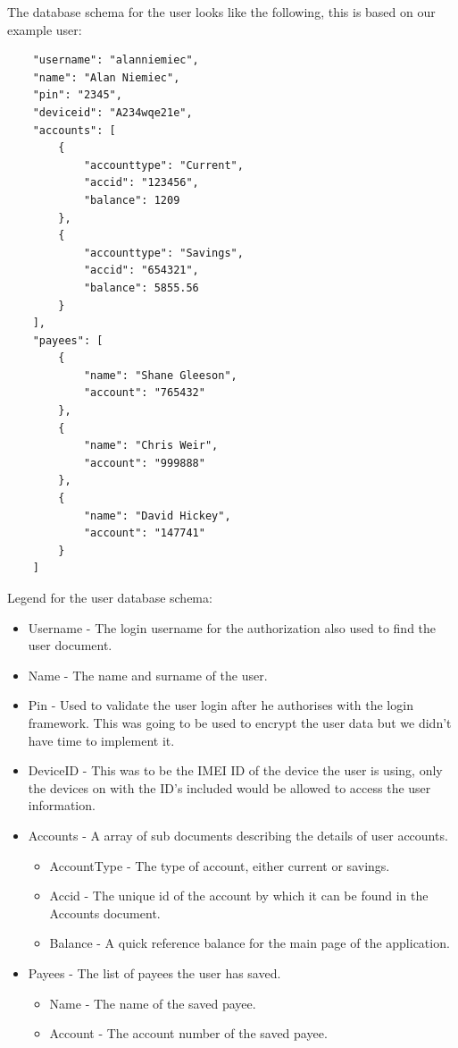The database schema for the user looks like the following, this is based on our example user:
\begin{verbatim}
    "username": "alanniemiec",
    "name": "Alan Niemiec",
    "pin": "2345",
    "deviceid": "A234wqe21e",
    "accounts": [
        {
            "accounttype": "Current",
            "accid": "123456",
            "balance": 1209
        },
        {
            "accounttype": "Savings",
            "accid": "654321",
            "balance": 5855.56
        }
    ],
    "payees": [
        {
            "name": "Shane Gleeson",
            "account": "765432"
        },
        {
            "name": "Chris Weir",
            "account": "999888"
        },
        {
            "name": "David Hickey",
            "account": "147741"
        }
    ]
\end{verbatim}

Legend for the user database schema:
\begin{itemize}
    \item Username - The login username for the authorization also used to find the user document.
    \item Name - The name and surname of the user.
    \item Pin - Used to validate the user login after he authorises with the login framework. This was going to be used to encrypt the user data but we didn't have time to implement it.
    \item DeviceID - This was to be the IMEI ID of the device the user is using, only the devices on with the ID's included would be allowed to access the user information.
    \item Accounts - A array of sub documents describing the details of user accounts.
        \begin{itemize}
             \item AccountType - The type of account, either current or savings.
             \item Accid - The unique id of the account by which it can be found in the Accounts document.
             \item Balance - A quick reference balance for the main page of the application.
        \end{itemize}
    \item Payees - The list of payees the user has saved.
        \begin{itemize}
            \item Name - The name of the saved payee.
            \item Account - The account number of the saved payee.
        \end{itemize}
\end{itemize}


